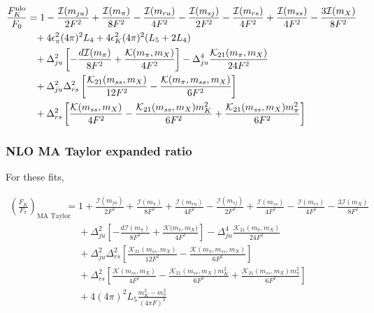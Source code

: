 \documentclass[prd,tightenlines,preprintnumbers,showpacs,superscriptaddress,notitlepage,eqsecnum,floatfix,notitlepage]{revtex4-1}
\begin{document}
\begin{align}
\frac{F_K^{\rm nlo}}{F_0} &= 1
-\frac{\mathcal{I}(m_{ju})}{2F^2}
+\frac{\mathcal{I}(m_\pi)}{8F^2}
-\frac{\mathcal{I}(m_{ru})}{4F^2}
-\frac{\mathcal{I}(m_{sj})}{2F^2}
-\frac{\mathcal{I}(m_{rs})}{4F^2}
+\frac{\mathcal{I}(m_{ss})}{4F^2}
-\frac{3\mathcal{I}(m_X)}{8F^2}
\nonumber\\&\phantom{=}
+4\epsilon_\pi^2 (4 \pi)^2 L_4 + 4\epsilon_K^2 (4 \pi)^2  (L_5 + 2L_4)
\nonumber\\&\phantom{=}
+\Delta_{ju}^2 \left[ -\frac{d\mathcal{I}(m_\pi)}{8F^2} + \frac{\mathcal{K(}m_\pi,m_X)}{4F^2} \right]
-\Delta_{ju}^4 \frac{\mathcal{K}_{21}(m_\pi,m_X)}{24 F^2}
\nonumber\\&\phantom{=}
+\Delta_{ju}^2\Delta_{rs}^2 \left[ \frac{\mathcal{K}_{21}(m_{ss},m_X)}{12F^2}
- \frac{\mathcal{K}(m_\pi, m_{ss}, m_X)}{6F^2} \right]
\nonumber\\&\phantom{=}
+\Delta_{rs}^2 \left[
\frac{\mathcal{K}(m_{ss},m_X)}{4F^2}
-\frac{\mathcal{K}_{21}(m_{ss},m_X) m_K^2}{6F^2}
+\frac{\mathcal{K}_{21}(m_{ss},m_X) m_\pi^2}{6F^2}
\right]
\end{align}


\subsubsection{NLO MA Taylor expanded ratio}
For these fits,

\begin{align}\label{eq:fkfpi_ma}
\left(\frac{F_K}{F_\pi}\right)_\text{MA Taylor} &= 1
+\frac{\mathcal{I}(m_{ju})}{2F^2}
+\frac{\mathcal{I}(m_\pi)}{8F^2}
+\frac{\mathcal{I}(m_{ru})}{4F^2}
-\frac{\mathcal{I}(m_{sj})}{2F^2}
+\frac{\mathcal{I}(m_{ss})}{4F^2}
-\frac{\mathcal{I}(m_{rs})}{4F^2}
-\frac{3\mathcal{I}(m_X)}{8F^2}
\nonumber\\&\phantom{=}
+\Delta_{ju}^2 \left[ -\frac{d\mathcal{I}(m_\pi)}{8F^2} + \frac{\mathcal{K(}m_\pi,m_X)}{4F^2} \right]
-\Delta_{ju}^4 \frac{\mathcal{K}_{21}(m_\pi,m_X)}{24 F^2}
\nonumber\\&\phantom{=}
+\Delta_{ju}^2\Delta_{rs}^2 \left[ \frac{\mathcal{K}_{21}(m_{ss},m_X)}{12F^2}
-\frac{\mathcal{K}(m_\pi, m_{ss}, m_X)}{6F^2}
 \right]
\nonumber\\&\phantom{=}
+\Delta_{rs}^2 \left[
\frac{\mathcal{K}(m_{ss},m_X)}{4F^2}
-\frac{\mathcal{K}_{21}(m_{ss},m_X) m_K^2}{6F^2}
+\frac{\mathcal{K}_{21}(m_{ss},m_X) m_\pi^2}{6F^2}
\right]
\nonumber\\&\phantom{=}
+ 4 (4\pi)^2 L_5 \frac{m_K^2 - m_\pi^2}{(4\pi F)^2}
\end{align}
\end{document}
